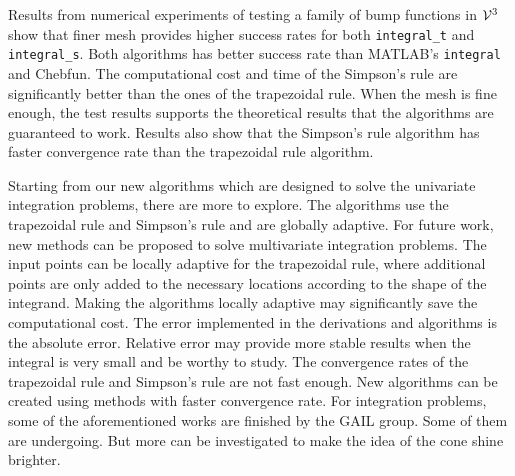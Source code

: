 \documentclass{iitthesis}
\theoremstyle{definition}
\theoremstyle{remark}
\begin{document}
Results from numerical experiments of testing a family of bump functions in $\mathcal{V}^3$ show that finer mesh provides higher success rates for both {\tt integral\_t} and {\tt integral\_s}. Both algorithms has better success rate than MATLAB's {\tt integral} and Chebfun. The computational cost and time of the Simpson's rule are significantly better than the ones of the trapezoidal rule. When the mesh is fine enough, the test results supports the theoretical results that the algorithms are guaranteed to work. Results also show that the Simpson's rule algorithm has faster convergence rate than the trapezoidal rule algorithm.


Starting from our new algorithms which are designed to solve the univariate integration problems, there are more to explore. The algorithms use the trapezoidal rule and Simpson's rule and are globally adaptive. For future work, new methods can be proposed to solve multivariate integration problems. The input points can be locally adaptive for the trapezoidal rule, where additional points are only added to the necessary locations according to the shape of the integrand. Making the algorithms locally adaptive may significantly save the computational cost. The error implemented in the derivations and algorithms is the absolute error. Relative error may provide more stable results when the integral is very small and be worthy to study. The convergence rates of the trapezoidal rule and Simpson's rule are not fast enough. New algorithms can be created using methods with faster convergence rate. For integration problems, some of the aforementioned works are finished by the GAIL group. Some of them are undergoing. But more can be investigated to make the idea of the cone shine brighter.



\clearpage


%
%
%
%
%
%
%
%
%
%
%
%

%


\end{document}
